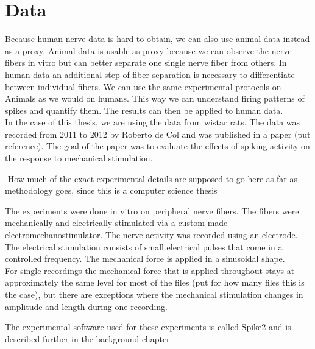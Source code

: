 \chapter{Data}

Because human nerve data is hard to obtain, we can also use animal data instead as a proxy. Animal data is usable as proxy because we can observe the nerve fibers in vitro but can better separate one single nerve fiber from others. In human data an additional step of fiber separation is necessary to differentiate between individual fibers. We can use the same experimental protocols on Animals as we would on humans. This way we can understand firing patterns of spikes and quantify them. The results can then be applied to human data. \\
In the case of this thesis, we are using the data from wistar rats. The data was recorded from 2011 to 2012 by Roberto de Col and was published in a paper (put reference). The goal of the paper was to evaluate the effects of spiking activity on the response to mechanical stimulation. 

-How much of the exact experimental details are supposed to go here as far as methodology goes, since this is a computer science thesis 

The experiments were done in vitro on peripheral nerve fibers. The fibers were mechanically and electrically stimulated via a custom made electromechanostimulator. The nerve activity was recorded using an electrode. The electrical stimulation consists of small electrical pulses that come in a controlled frequency. The mechanical force is applied in a sinusoidal shape. \\
For single recordings the mechanical force that is applied throughout stays at approximately the same level for most of the files (put for how many files this is the case), but there are exceptions where the mechanical stimulation changes in amplitude and length during one recording. 

The experimental software used for these experiments is called Spike2 and is described further in the background chapter.

\cleardoublepage
